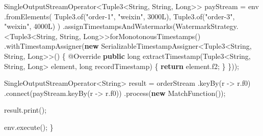 \documentclass[cn,11pt,chinese]{elegantbook}
\newenvironment{Shaded}{}{}
\newcommand{\AttributeTok}[1]{\textcolor[rgb]{0.49,0.56,0.16}{#1}}
\newcommand{\BuiltInTok}[1]{#1}
\newcommand{\DataTypeTok}[1]{\textcolor[rgb]{0.56,0.13,0.00}{#1}}
\newcommand{\DecValTok}[1]{\textcolor[rgb]{0.25,0.63,0.44}{#1}}
\newcommand{\FunctionTok}[1]{\textcolor[rgb]{0.02,0.16,0.49}{#1}}
\newcommand{\KeywordTok}[1]{\textcolor[rgb]{0.00,0.44,0.13}{\textbf{#1}}}
\newcommand{\NormalTok}[1]{#1}
\newcommand{\StringTok}[1]{\textcolor[rgb]{0.25,0.44,0.63}{#1}}
\begin{document}
\begin{Shaded}
\begin{Highlighting}[]
\NormalTok{        SingleOutputStreamOperator\textless{}Tuple3\textless{}}\BuiltInTok{String}\NormalTok{, }\BuiltInTok{String}\NormalTok{, }\BuiltInTok{Long}\NormalTok{\textgreater{}\textgreater{} payStream = env}
\NormalTok{                .}\FunctionTok{fromElements}\NormalTok{(}
\NormalTok{                        Tuple3.}\FunctionTok{of}\NormalTok{(}\StringTok{"order{-}1"}\NormalTok{, }\StringTok{"weixin"}\NormalTok{, }\DecValTok{3000L}\NormalTok{),}
\NormalTok{                        Tuple3.}\FunctionTok{of}\NormalTok{(}\StringTok{"order{-}3"}\NormalTok{, }\StringTok{"weixin"}\NormalTok{, }\DecValTok{4000L}\NormalTok{)}
\NormalTok{                )}
\NormalTok{                .}\FunctionTok{assignTimestampsAndWatermarks}\NormalTok{(WatermarkStrategy.\textless{}Tuple3\textless{}}\BuiltInTok{String}\NormalTok{, }\BuiltInTok{String}\NormalTok{, }\BuiltInTok{Long}\NormalTok{\textgreater{}\textgreater{}}\FunctionTok{forMonotonousTimestamps}\NormalTok{()}
\NormalTok{                        .}\FunctionTok{withTimestampAssigner}\NormalTok{(}\KeywordTok{new}\NormalTok{ SerializableTimestampAssigner\textless{}Tuple3\textless{}}\BuiltInTok{String}\NormalTok{, }\BuiltInTok{String}\NormalTok{, }\BuiltInTok{Long}\NormalTok{\textgreater{}\textgreater{}() \{}
                            \AttributeTok{@Override}
                            \KeywordTok{public} \DataTypeTok{long} \FunctionTok{extractTimestamp}\NormalTok{(Tuple3\textless{}}\BuiltInTok{String}\NormalTok{, }\BuiltInTok{String}\NormalTok{, }\BuiltInTok{Long}\NormalTok{\textgreater{} element, }\DataTypeTok{long}\NormalTok{ recordTimestamp) \{}
                                \KeywordTok{return}\NormalTok{ element.}\FunctionTok{f2}\NormalTok{;}
\NormalTok{                            \}}
\NormalTok{                        \}));}

\NormalTok{        SingleOutputStreamOperator\textless{}}\BuiltInTok{String}\NormalTok{\textgreater{} result = orderStream}
\NormalTok{                .}\FunctionTok{keyBy}\NormalTok{(r {-}\textgreater{} r.}\FunctionTok{f0}\NormalTok{)}
\NormalTok{                .}\FunctionTok{connect}\NormalTok{(payStream.}\FunctionTok{keyBy}\NormalTok{(r {-}\textgreater{} r.}\FunctionTok{f0}\NormalTok{))}
\NormalTok{                .}\FunctionTok{process}\NormalTok{(}\KeywordTok{new} \FunctionTok{MatchFunction}\NormalTok{());}

\NormalTok{        result.}\FunctionTok{print}\NormalTok{();}

\NormalTok{        env.}\FunctionTok{execute}\NormalTok{();}
\NormalTok{    \}}


\end{Highlighting}
\end{Shaded}
\end{document}
